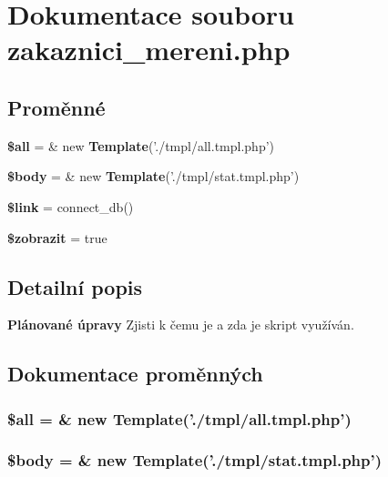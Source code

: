 \section{Dokumentace souboru zakaznici\_\-mereni.php}
\label{zakaznici__mereni_8php}
\subsection*{Proměnné}
\begin{CompactItemize}
\item 
{\bf \$all} = \& new {\bf Template}('./tmpl/all.tmpl.php')
\item 
{\bf \$body} = \& new {\bf Template}('./tmpl/stat.tmpl.php')
\item 
{\bf \$link} = connect\_\-db()
\item 
{\bf \$zobrazit} = true
\end{CompactItemize}


\subsection{Detailní popis}
\begin{Desc}
\item[{\bf Plánované úpravy}]Zjisti k čemu je a zda je skript využíván. \end{Desc}


\subsection{Dokumentace proměnných}
\subsubsection{\setlength{\rightskip}{0pt plus 5cm}\$all = \& new {\bf Template}('./tmpl/all.tmpl.php')}\label{zakaznici__mereni_8php_3c74ea9d2348c9aba28d36e692bef2d2}


\subsubsection{\setlength{\rightskip}{0pt plus 5cm}\$body = \& new {\bf Template}('./tmpl/stat.tmpl.php')}\label{zakaznici__mereni_8php_26b9f9373f7bb79dfcf8a86dff086b45}


